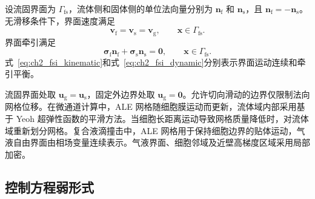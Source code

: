 设流固界面为 $\Gamma_{\mathrm{fs}}$，流体侧和固体侧的单位法向量分别为 $\boldsymbol{n}_{\mathrm f}$ 和 $\boldsymbol{n}_{\mathrm s}$，且 $\boldsymbol{n}_{\mathrm f}=-\boldsymbol{n}_{\mathrm s}$。无滑移条件下，界面速度满足
\begin{equation}
\boldsymbol{v}_{\mathrm f}
=
\boldsymbol{v}_{\mathrm s}
=
\boldsymbol{v}_{\mathrm g},
\qquad
\boldsymbol{x}\in\Gamma_{\mathrm{fs}}.
\label{eq:ch2_fsi_kinematic}
\end{equation}
界面牵引满足
\begin{equation}
\boldsymbol{\sigma}_{\mathrm f}\boldsymbol{n}_{\mathrm f}
+
\boldsymbol{\sigma}_{\mathrm s}\boldsymbol{n}_{\mathrm s}
=
\boldsymbol{0},
\qquad
\boldsymbol{x}\in\Gamma_{\mathrm{fs}}.
\label{eq:ch2_fsi_dynamic}
\end{equation}
式~\eqref{eq:ch2_fsi_kinematic}和式~\eqref{eq:ch2_fsi_dynamic}分别表示界面运动连续和牵引平衡\cite{hou2012numerical}。

流固界面处取 $\boldsymbol{u}_{\mathrm g}=\boldsymbol{u}_{\mathrm s}$，固定外边界处取 $\boldsymbol{u}_{\mathrm g}=\boldsymbol{0}$。允许切向滑动的边界仅限制法向网格位移。在微通道计算中，ALE 网格随细胞膜运动而更新，流体域内部采用基于 Yeoh 超弹性函数的平滑方法\cite{yeoh1993some}。当细胞长距离运动导致网格质量降低时，对流体域重新划分网格。复合液滴撞击中，ALE 网格用于保持细胞边界的贴体运动，气液自由界面由相场变量连续表示。气液界面、细胞邻域及近壁高梯度区域采用局部加密。

\subsection{控制方程弱形式}
\label{subsec:ch2_weak_form}

